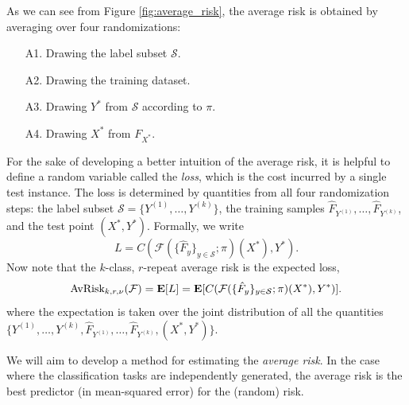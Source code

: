 \documentclass[12pt]{article}
\begin{document}
As we can see from Figure \ref{fig:average_risk}, the average risk is obtained by averaging
over four randomizations:
\begin{enumerate}
\item[A1.] Drawing the label subset $\mathcal{S}$.
\item[A2.] Drawing the training dataset.
\item[A3.] Drawing $Y^*$ from $\mathcal{S}$ according to $\pi$.
\item[A4.] Drawing $X^*$ from $F_{X^*}$.
\end{enumerate}

For the sake of developing a better intuition of the average risk, it
is helpful to define a random variable called the \emph{loss}, which
is the cost incurred by a single test instance.  The loss is
determined by quantities from all four randomization steps: the label
subset $\mathcal{S} = \{Y^{(1)},\hdots, Y^{(k)}\}$, the training samples
$\hat{F}_{Y^{(1)}},\hdots, \hat{F}_{Y^{(k)}}$, and the test point $(X^*, Y^*)$.
Formally, we write
\[
L = C(\mathcal{F}(\{\hat{F}_y\}_{y \in \mathcal{S}}; \pi)(X^*), Y^*).
\]
Now note that the $k$-class, $r$-repeat average risk is the expected loss,
\begin{equation}\label{eq:avrisk_EL}
\text{AvRisk}_{k, r, \nu}(\mathcal{F}) = \textbf{E}[L] = \textbf{E}[C(\mathcal{F}(\{\hat{F}_y\}_{y \in \mathcal{S}}; \pi)(X^*), Y^*)].
\end{equation}
where the expectation is taken over the joint distribution of all the
quantities $\{Y^{(1)},\hdots,
Y^{(k)}, \hat{F}_{Y^{(1)}},\hdots, \hat{F}_{Y^{(k)}}, (X^*, Y^*)\}$.

We will aim to develop a method for estimating the \emph{average
risk}.  In the case where the classification tasks are independently
generated, the average risk is the best predictor (in mean-squared
error) for the (random) risk.
\end{document}
